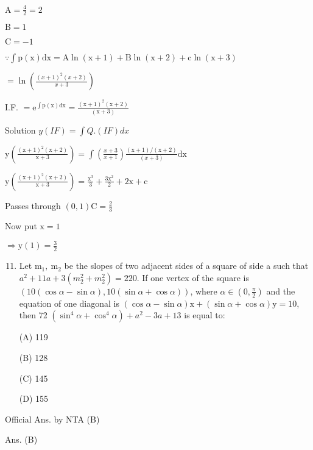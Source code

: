 \documentclass[10pt]{article}
\begin{document}
$\mathrm{A}=\frac{4}{2}=2$

$\mathrm{B}=1$

$\mathrm{C}=-1$

$\because \int \mathrm{p}(\mathrm{x}) \mathrm{dx}=\mathrm{A} \ln (\mathrm{x}+1)+\mathrm{B} \ln (\mathrm{x}+2)+\mathrm{c} \ln (\mathrm{x}+3)$

$=\ln \left(\frac{(x+1)^{2}(x+2)}{x+3}\right)$

I.F. $=\mathrm{e}^{\int \mathrm{p}(\mathrm{x}) \mathrm{dx}}=\frac{(\mathrm{x}+1)^{2}(\mathrm{x}+2)}{(\mathrm{x}+3)}$

Solution $y(I F)=\int Q .(I F) d x$

$\mathrm{y}\left(\frac{(\mathrm{x}+1)^{2}(\mathrm{x}+2)}{\mathrm{x}+3}\right)=\int\left(\frac{x+3}{x+1}\right) \frac{(\mathrm{x}+1) /(\mathrm{x}+2)}{(x+3)} \mathrm{dx}$

$\mathrm{y}\left(\frac{(\mathrm{x}+1)^{2}(\mathrm{x}+2)}{\mathrm{x}+3}\right)=\frac{\mathrm{x}^{3}}{3}+\frac{3 \mathrm{x}^{2}}{2}+2 \mathrm{x}+\mathrm{c}$

Passes through $(0,1) \mathrm{C}=\frac{2}{3}$

Now put $\mathrm{x}=1$

$\Rightarrow \mathrm{y}(1)=\frac{3}{2}$

\begin{enumerate}
  \setcounter{enumi}{10}
  \item Let $\mathrm{m}_{1}, \mathrm{~m}_{2}$ be the slopes of two adjacent sides of a square of side a such that $a^{2}+11 a+3\left(m_{2}^{2}+m_{2}^{2}\right)=220$. If one vertex of the square is $(10(\cos \alpha-\sin \alpha), 10(\sin \alpha+\cos \alpha))$, where $\alpha \in\left(0, \frac{\pi}{2}\right)$ and the equation of one diagonal is $(\cos \alpha-\sin \alpha) \mathrm{x}+(\sin \alpha+\cos \alpha) \mathrm{y}=10$, then 72 $\left(\sin ^{4} \alpha+\cos ^{4} \alpha\right)+a^{2}-3 a+13$ is equal to:

(A) 119

(B) 128

(C) 145

(D) 155
\end{enumerate}

Official Ans. by NTA (B)

Ans. (B)
\end{document}
